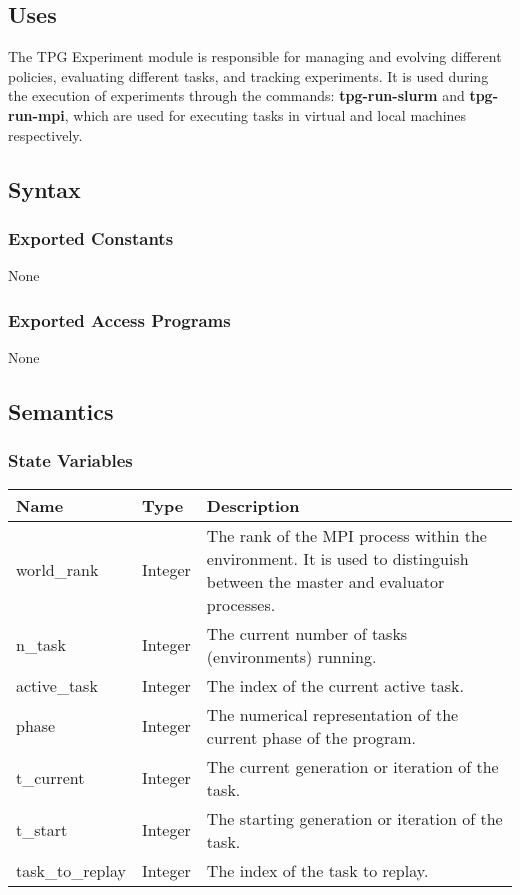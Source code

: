 \documentclass[12pt, titlepage]{article}
\begin{document}
\subsection{Uses}
The TPG Experiment module is responsible for managing and evolving different policies, evaluating different tasks, and tracking experiments. It is used during the execution of experiments through the commands: \textbf{tpg-run-slurm} and \textbf{tpg-run-mpi}, which are used for executing tasks in virtual and local machines respectively.
\subsection{Syntax}

\subsubsection{Exported Constants}
None

\subsubsection{Exported Access Programs}
None

\subsection{Semantics}

\subsubsection{State Variables}
\begin{center}
  \begin{tabular}{p{4cm} p{3cm} p{7cm}}
  \hline
  \textbf{Name} & \textbf{Type} & \textbf{Description} \\
  \hline
  world\_rank & Integer & The rank of the MPI process within the environment. It is used to distinguish between the master and evaluator processes. \\
  \hline
  n\_task & Integer & The current number of tasks (environments) running. \\
  \hline
  active\_task & Integer & The index of the current active task. \\
  \hline
  phase & Integer & The numerical representation of the current phase of the program. \\
  \hline
  t\_current & Integer & The current generation or iteration of the task. \\
  \hline
  t\_start & Integer & The starting generation or iteration of the task. \\
  \hline
  task\_to\_replay & Integer & The index of the task to replay. \\
  \hline
  \end{tabular}
\end{center}
\end{document}
